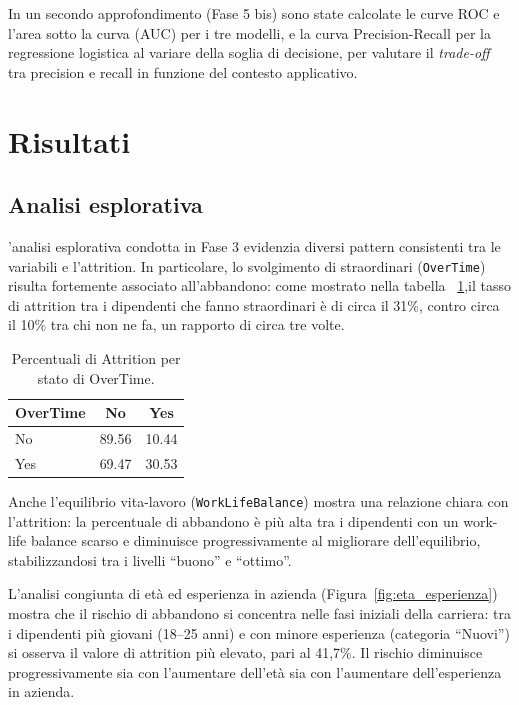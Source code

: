 \documentclass[9pt,a4paper,twocolumn,twoside]{tau-class/tau}
\begin{document}
In un secondo approfondimento (Fase 5 bis) sono state calcolate le curve ROC e l'area sotto la curva (AUC) per i tre modelli, e la curva Precision-Recall per la regressione logistica al variare della soglia di decisione, per valutare il \emph{trade-off} tra precision e recall in funzione del contesto applicativo.

\section{Risultati}
\label{sec:risultati}

\subsection{Analisi esplorativa}

'analisi esplorativa condotta in Fase 3 evidenzia diversi pattern
consistenti tra le variabili e l'attrition. In particolare, lo svolgimento di straordinari (\texttt{OverTime}) risulta fortemente associato all'abbandono: come mostrato nella tabella ~\ref{tab:overtime-attrition},il tasso di attrition tra i dipendenti che fanno straordinari è di circa il 31\%, contro circa il 10\% tra chi non ne fa, un rapporto di circa tre volte.

\begin{table}[ht]
    \centering
    \begin{tabular}{lcc}
        \toprule
        \textbf{OverTime} & \textbf{No} & \textbf{Yes} \\
        \midrule
        No  & 89.56 & 10.44 \\
        Yes & 69.47 & 30.53 \\
        \bottomrule
    \end{tabular}
    \caption{Percentuali di Attrition per stato di OverTime.}
    \label{tab:overtime-attrition}
\end{table}


Anche l'equilibrio vita-lavoro (\texttt{WorkLifeBalance}) mostra una
relazione chiara con l'attrition: la percentuale di abbandono è più alta tra i dipendenti con un work-life balance scarso e diminuisce progressivamente al migliorare dell'equilibrio, stabilizzandosi tra i livelli ``buono'' e ``ottimo''.

L'analisi congiunta di età ed esperienza in azienda (Figura~\ref{fig:eta_esperienza}) mostra che il rischio di abbandono si concentra nelle fasi iniziali della carriera: tra i dipendenti più giovani (18--25 anni) e con minore esperienza (categoria ``Nuovi'') si osserva il valore di attrition più elevato, pari al 41,7\%. Il rischio diminuisce progressivamente sia con l'aumentare dell'età sia con l'aumentare dell'esperienza in azienda.
\end{document}

